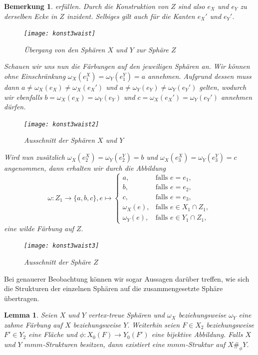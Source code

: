 \documentclass[12pt,titlepage,twoside,cleardoublepage]{article}
\theoremstyle{nummermitklammern}
\newtheorem{lemma}[temp]{Lemma}
\newtheorem{bemerkung}[temp]{Bemerkung}
\newtheorem{lemma}[zahl]{Lemma}
\newtheorem{bemerkung}[zahl]{Bemerkung}
\numberwithin{equation}{section}
\begin{document}
\begin{bemerkung}
erfüllen. Durch die Konstruktion von $Z$ sind also $e_X$ und $e_Y$ zu derselben Ecke in $Z$ inzident. Selbiges gilt auch für die Kanten $e_X'$ und $e_Y'.$ 
\begin{figure}[H]
\begin{center}
\texttt{[image: konst3waist]}
\end{center}
\caption{Übergang von den Sphären $X$ und $Y$ zur Sphäre $Z$}
\end{figure}   
Schauen wir uns nun die Färbungen auf den jeweiligen Sphären an. Wir können ohne Einschränkung $\omega_X(e_1^X)=\omega_Y(e_1^Y)=a$ annehmen. Aufgrund dessen muss dann $
a\neq \omega_X(e_X) \neq\omega_X(e_X')$
und $
a\neq \omega_Y(e_Y) \neq\omega_Y(e_Y')$
gelten, wodurch wir ebenfalls $
b= \omega_X(e_X) =\omega_Y(e_Y)$ und $
c= \omega_X(e_X') =\omega_Y(e_Y')$ annehmen dürfen.
\begin{figure}[H]
\begin{center}
\texttt{[image: konst3waist2]}
\end{center}
\caption{Ausschnitt der Sphären $X$ und $Y$}
\end{figure}
Wird nun zusätzlich $\omega_X(e_2^X)=\omega_Y(e_2^Y)=b$ und $\omega_X(e_3^X)=\omega_Y(e_3^Y)=c$ angenommen, dann erhalten wir durch die Abbildung 
\[
\omega: Z_1 \to\{a,b,c\},e\mapsto
 \begin{cases}
 a,&\text{falls }e=e_1,\\
 b,&\text{falls } e=e_2, \\
 c,&\text{falls }e=e_3,\\
 \omega_X(e),&\text{falls }e \in X_1\cap Z_1,\\
 \omega_Y(e),&\text{falls }e\in Y_1 \cap Z_1,
 \end{cases}
\]
eine wilde Färbung auf $Z.$
\begin{figure}[H]
\begin{center}
\texttt{[image: konst3waist3]}
\end{center}
\caption{Ausschnitt der Sphäre $Z$}
\end{figure}
\end{bemerkung}
Bei genauerer Beobachtung können wir sogar Aussagen darüber treffen, wie sich die Strukturen der einzelnen Sphären auf die zusammengesetzte Sphäre übertragen.
\begin{lemma}
Seien $X$ und $Y$ vertex-treue Sphären und $\omega_X$ beziehungsweise $\omega_Y$ eine zahme Färbung auf $X$ beziehungsweise $Y.$ Weiterhin seien $F\in X_2$ beziehungsweise $F'\in Y_2$ eine Fläche und $\phi:X_0(F)\to Y_0(F')$ eine bijektive Abbildung. 
Falls $X$ und $Y$ $mmm$-Strukturen besitzen, dann existiert eine $mmm$-Struktur auf $X\#_{\phi}Y$.
\end{lemma}
\end{document}
